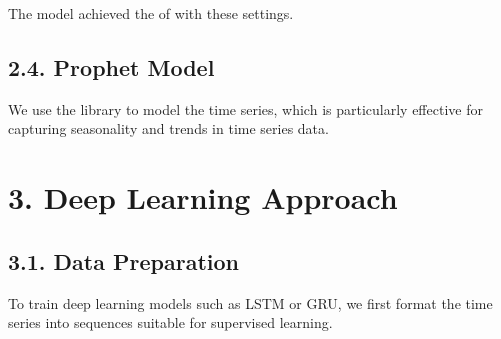 \documentclass[letterpaper,10pt,english]{sphinxmanual}
\begin{document}
\sphinxAtStartPar
The model achieved the  of  with these settings.


\subsection{2.4. Prophet Model}
\label{\detokenize{index:prophet-model}}
\sphinxAtStartPar
We use the  library to model the time series, which is particularly effective for capturing seasonality and trends in time series data.

\begin{sphinxVerbatim}[commandchars=\\\{\}]
 

     

  
\end{sphinxVerbatim}


\section{3. Deep Learning Approach}
\label{\detokenize{index:deep-learning-approach}}

\subsection{3.1. Data Preparation}
\label{\detokenize{index:id1}}
\sphinxAtStartPar
To train deep learning models such as LSTM or GRU, we first format the time series into sequences suitable for supervised learning.
\end{document}
